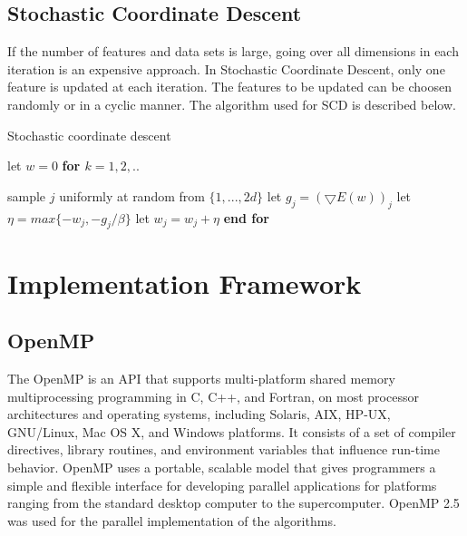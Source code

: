 \documentclass{sigplanconf}
\newlength\myindent
\newcommand\bindent{%
  \begingroup
  \setlength{\itemindent}{\myindent}
  \addtolength{\algorithmicindent}{\myindent}
}
\newcommand\eindent{\endgroup}
\begin{document}
\subsection{Stochastic Coordinate Descent}
If the number of features and data sets is large, going over all dimensions in each iteration is an
expensive approach. In Stochastic Coordinate Descent, only one feature is updated at each iteration. The 
features to be updated can be choosen randomly or in a cyclic manner. The algorithm used for SCD is 
described below.

\begin{algorithm}
\caption{Stochastic coordinate descent}
\begin{algorithmic} 
\STATE let $w = 0$
\STATE \bf{for} \begin{math} k = 1,2,.. \end{math}
    \bindent
	\STATE \textnormal{sample \begin{math}j\end{math} uniformly at random from \begin{math}\{1,...,2d\}\end{math}}
	\STATE \textnormal{let \begin{math}g_j = (\bigtriangledown{E(w)})_j\end{math}}
	\STATE \textnormal{let \begin{math}\eta = max\{ -w_j, -g_j/\beta \}\end{math}}
	\STATE \textnormal{let \begin{math}w_j = w_j + \eta\end{math}}
    \eindent
\STATE \bf{end for}
\end{algorithmic}
\end{algorithm}

\section{Implementation Framework}
\subsection{OpenMP}
The OpenMP \cite{openmp} is an API that supports multi-platform shared memory multiprocessing programming in C, C++, and Fortran, on most processor architectures and operating systems, including Solaris, AIX, HP-UX, GNU/Linux, Mac OS X, and Windows platforms. It consists of a set of compiler directives, library routines, and environment variables that influence run-time behavior. OpenMP uses a portable, scalable model that gives programmers a simple and flexible interface for developing parallel applications for platforms ranging from the standard desktop computer to the supercomputer. OpenMP 2.5 was used for the parallel
implementation of the algorithms.
\end{document}
